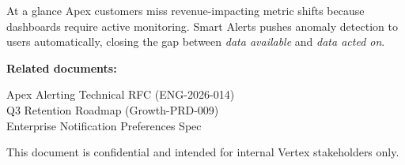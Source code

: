 \begin{titlepage}
\vspace{1.2cm}
\begin{minipage}[t]{0.48\linewidth}
\begin{calloutbox}{At a glance}
\footnotesize
Apex customers miss revenue-impacting metric shifts because dashboards require active monitoring. Smart Alerts pushes anomaly detection to users automatically, closing the gap between \emph{data available} and \emph{data acted on}.
\end{calloutbox}
\end{minipage}\hfill
\begin{minipage}[t]{0.48\linewidth}
\begin{statusbox}
\footnotesize
\textbf{\color{prdaccent}Related documents:}\\
\raggedright
Apex Alerting Technical RFC (ENG-2026-014)\\
Q3 Retention Roadmap (Growth-PRD-009)\\
Enterprise Notification Preferences Spec
\end{statusbox}
\end{minipage}
\par

\vfill
{\footnotesize\color{prdslate} This document is confidential and intended for internal Vertex stakeholders only.}
\end{titlepage}
